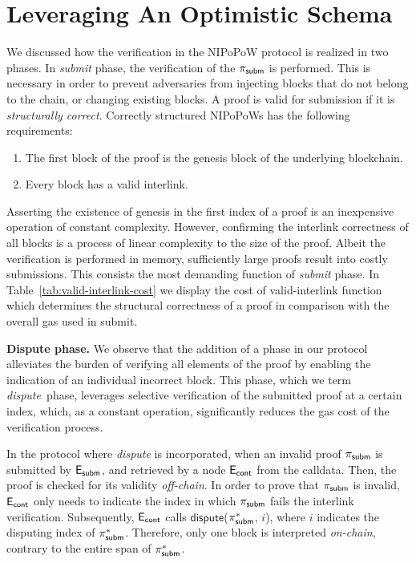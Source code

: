 \section{Leveraging An Optimistic Schema}

We discussed how the verification in the NIPoPoW protocol is realized in two
phases. In \emph{submit} phase, the verification of the $\mathsf{\pi_{subm}}$ is performed.
This is necessary in order to prevent adversaries from injecting blocks that do
not belong to the chain, or changing existing blocks. A proof is valid for
submission if it is \emph{structurally correct}. Correctly structured
NIPoPoWs has the following requirements:

\begin{enumerate}
    \item The first block of the proof is the genesis block of the underlying
        blockchain.
    \item Every block has a valid interlink.
\end{enumerate}

Asserting the existence of genesis in the first index of a proof is an
inexpensive operation of constant complexity. However, confirming the interlink
correctness of all blocks is a process of linear complexity to the size of the
proof. Albeit the verification is performed in memory, sufficiently large
proofs result into costly submissions. This consists the most demanding
function of \emph{submit} phase. In Table~\ref{tab:valid-interlink-cost} we
display the cost of \textsf{valid-interlink} function which determines the
structural correctness of a proof in comparison with the overall gas used in
\textsf{submit}.



\newcommand{\dispute}{\emph{dispute\ }} \noindent \textbf{Dispute phase.} We
observe that the addition of a phase in our protocol alleviates the burden of
verifying all elements of the proof by enabling the indication of an individual
incorrect block. This phase, which we term \dispute phase, leverages selective
verification of the submitted proof at a certain index, which, as a constant
operation, significantly reduces the gas cost of the verification process.

In the protocol where \emph{dispute} is incorporated, when an invalid proof
$\mathsf{\pi_{subm}}$ is submitted by $\mathsf{E_{subm}}$, and retrieved by a node $\mathsf{E_{cont}}$ from the calldata.
Then, the proof is checked for its validity \emph{off-chain}. In order to prove
that $\mathsf{\pi_{subm}}$ is invalid, $\mathsf{E_{cont}}$ only needs to indicate the index in which $\mathsf{\pi_{subm}}$
fails the interlink verification. Subsequently, $\mathsf{E_{cont}}$ calls
$\textsf{dispute}$($\mathsf{\pi_{subm}^*}$, $i$), where $i$ indicates the disputing index of
$\mathsf{\pi_{subm}^*}$. Therefore, only one block is interpreted \emph{on-chain}, contrary to
the entire span of $\mathsf{\pi_{subm}^*}$.

